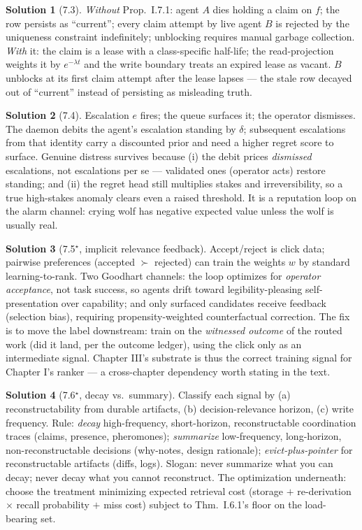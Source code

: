 \documentclass[11pt,a4paper]{article}
\theoremstyle{definition}
\newtheorem{sol}{Solution}
\theoremstyle{remark}
\begin{document}
\begin{sol}[7.3]
\emph{Without} Prop.~I.7.1: agent $A$ dies holding a claim on $f$; the row persists as ``current''; every claim attempt by live agent $B$ is rejected by the uniqueness constraint indefinitely; unblocking requires manual garbage collection. \emph{With} it: the claim is a lease with a class-specific half-life; the read-projection weights it by $e^{-\lambda t}$ and the write boundary treats an expired lease as vacant. $B$ unblocks at its first claim attempt after the lease lapses --- the stale row decayed out of ``current'' instead of persisting as misleading truth.
\end{sol}

\begin{sol}[7.4]
Escalation $e$ fires; the queue surfaces it; the operator dismisses. The daemon debits the agent's escalation standing by $\delta$; subsequent escalations from that identity carry a discounted prior and need a higher regret score to surface. Genuine distress survives because (i) the debit prices \emph{dismissed} escalations, not escalations per se --- validated ones (operator acts) restore standing; and (ii) the regret head still multiplies stakes and irreversibility, so a true high-stakes anomaly clears even a raised threshold. It is a reputation loop on the alarm channel: crying wolf has negative expected value unless the wolf is usually real.
\end{sol}

\begin{sol}[7.5$^\star$, implicit relevance feedback]
Accept/reject is click data; pairwise preferences (accepted $\succ$ rejected) can train the weights $w$ by standard learning-to-rank. Two Goodhart channels: the loop optimizes for \emph{operator acceptance}, not task success, so agents drift toward legibility-pleasing self-presentation over capability; and only surfaced candidates receive feedback (selection bias), requiring propensity-weighted counterfactual correction. The fix is to move the label downstream: train on the \emph{witnessed outcome} of the routed work (did it land, per the outcome ledger), using the click only as an intermediate signal. Chapter III's substrate is thus the correct training signal for Chapter I's ranker --- a cross-chapter dependency worth stating in the text.
\end{sol}

\begin{sol}[7.6$^\star$, decay vs.\ summary]
Classify each signal by (a) reconstructability from durable artifacts, (b) decision-relevance horizon, (c) write frequency. Rule: \emph{decay} high-frequency, short-horizon, reconstructable coordination traces (claims, presence, pheromones); \emph{summarize} low-frequency, long-horizon, non-reconstructable decisions (why-notes, design rationale); \emph{evict-plus-pointer} for reconstructable artifacts (diffs, logs). Slogan: never summarize what you can decay; never decay what you cannot reconstruct. The optimization underneath: choose the treatment minimizing expected retrieval cost (storage $+$ re-derivation $\times$ recall probability $+$ miss cost) subject to Thm.~I.6.1's floor on the load-bearing set.
\end{sol}
\end{document}
